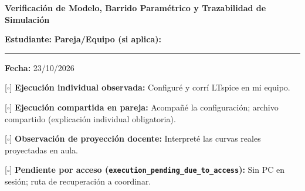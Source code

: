 \documentclass[11pt, a4paper]{article}
\begin{document}
\begin{tcolorbox}[colback=ucbblue!5!white, colframe=ucbblue, title=\textbf{Artefacto A2: Hoja de Auditoría de Ejecución y Contraste LTspice (W12S3)}]
    \centering \textbf{Verificación de Modelo, Barrido Paramétrico y Trazabilidad de Simulación}
\end{tcolorbox}

\noindent\textbf{Estudiante:} \hrulefill \quad \textbf{Pareja/Equipo (si aplica):} \rule{3.5cm}{0.4pt} \quad \textbf{Fecha:} 23/10/2026

\vspace{0.2cm}
\begin{tcolorbox}[colback=gray!5, colframe=gray!60, title=\textbf{Modalidad de Evidencia Computacional (Marque con precisión)}]
{[$\square$]} \textbf{Ejecución individual observada:} Configuré y corrí LTspice en mi equipo.\par\vspace{0.1cm}
{[$\square$]} \textbf{Ejecución compartida en pareja:} Acompañé la configuración; archivo compartido (explicación individual obligatoria).\par\vspace{0.1cm}
{[$\square$]} \textbf{Observación de proyección docente:} Interpreté las curvas reales proyectadas en aula.\par\vspace{0.1cm}
{[$\square$]} \textbf{Pendiente por acceso (\texttt{execution\_pending\_due\_to\_access}):} Sin PC en sesión; ruta de recuperación a coordinar.
\end{tcolorbox}
\end{document}
